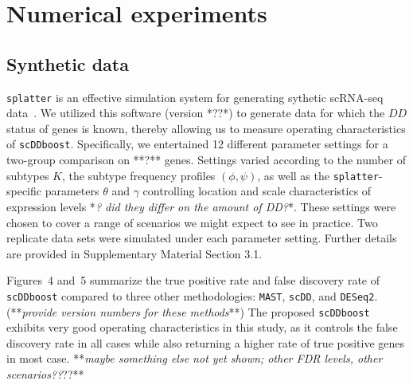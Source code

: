\documentclass[aoas,preprint]{imsart}
\begin{document}
\section{Numerical experiments}

\subsection{Synthetic data} 

\verb+splatter+  is an effective simulation system for generating sythetic scRNA-seq data~\citep{ref:Zappia}. 
We utilized  this software (version *??*) 
to generate data for which the $DD$ status of genes is known,  thereby allowing us to 
measure operating characteristics of \verb+scDDboost+.  Specifically, 
we entertained 12 different parameter settings for a two-group comparison on **?** genes.  Settings
varied according to the number of subtypes $K$, the subtype frequency profiles $(\phi,\psi)$, as well
as the  \verb+splatter+-specific parameters $\theta$ and $\gamma$ controlling location and scale characteristics
of expression levels *{\em ? did they differ on the amount of DD?}*. These settings were chosen to cover a range
of scenarios we might expect to see in practice.  Two replicate data sets were simulated under each parameter setting.
Further details are provided in Supplementary Material Section 3.1.   

Figures~4 and~5 summarize the true positive rate and false discovery rate
of \verb+scDDboost+ compared to three other methodologies: \verb+MAST+, \verb+scDD+, and \verb+DESeq2+. 
(**{\em provide version numbers for these methods}**)
The proposed \verb+scDDboost+ exhibits very good operating characteristics in this study, as it controls the 
false discovery rate in all cases while also returning a higher rate of true positive genes in most case.
**{\em maybe something else not yet shown; other FDR levels, other scenarios??}??**
\end{document}
